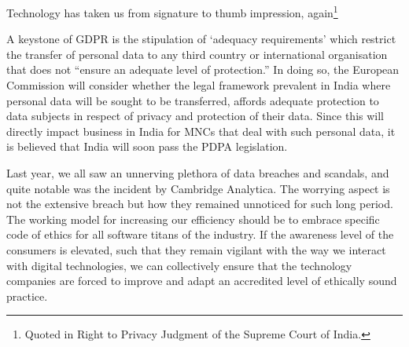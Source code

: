\begin{multicols}{2}
Technology has taken us from signature to thumb impression, again\footnote{Quoted in Right to Privacy Judgment of the Supreme Court of India.}

A keystone of GDPR is the stipulation of ‘adequacy requirements’ which restrict the transfer of personal data to any third country or international organisation that does not “ensure an adequate level of protection.” In doing so, the European Commission will consider whether the legal framework prevalent in India where personal data will be sought to be transferred, affords adequate protection to data subjects in respect of privacy and protection of their data. Since this will directly impact business in India for MNCs that deal with such personal data, it is believed that India will soon pass the PDPA legislation.

Last year, we all saw an unnerving plethora of data breaches and scandals, and quite notable was the incident by Cambridge Analytica. The worrying aspect is not the extensive breach but how they remained unnoticed for such long period. The working model for increasing our efficiency should be to embrace specific code of ethics for all software titans of the industry. If the awareness level of the consumers is elevated, such that they remain vigilant with the way we interact with digital technologies, we can collectively ensure that the technology companies are forced to improve and adapt an accredited level of ethically sound practice.
\end{multicols}
